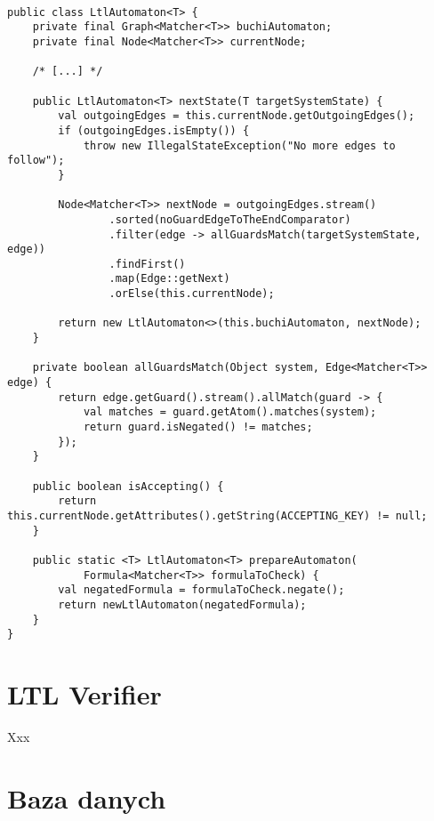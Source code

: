 \begin{minipage}{\linewidth}
\begin{lstlisting}[caption={Implementacja automatu Büchiego.},captionpos=b,label={lst:ltl_automaton}]

public class LtlAutomaton<T> {
    private final Graph<Matcher<T>> buchiAutomaton;
    private final Node<Matcher<T>> currentNode;

    /* [...] */

    public LtlAutomaton<T> nextState(T targetSystemState) {
        val outgoingEdges = this.currentNode.getOutgoingEdges();
        if (outgoingEdges.isEmpty()) {
            throw new IllegalStateException("No more edges to follow");
        }

        Node<Matcher<T>> nextNode = outgoingEdges.stream()
                .sorted(noGuardEdgeToTheEndComparator)
                .filter(edge -> allGuardsMatch(targetSystemState, edge))
                .findFirst()
                .map(Edge::getNext)
                .orElse(this.currentNode);

        return new LtlAutomaton<>(this.buchiAutomaton, nextNode);
    }

    private boolean allGuardsMatch(Object system, Edge<Matcher<T>> edge) {
        return edge.getGuard().stream().allMatch(guard -> {
            val matches = guard.getAtom().matches(system);
            return guard.isNegated() != matches;
        });
    }

    public boolean isAccepting() {
        return this.currentNode.getAttributes().getString(ACCEPTING_KEY) != null;
    }

    public static <T> LtlAutomaton<T> prepareAutomaton(
            Formula<Matcher<T>> formulaToCheck) {
        val negatedFormula = formulaToCheck.negate();
        return newLtlAutomaton(negatedFormula);
    }
}

\end{lstlisting}
\end{minipage}

\newpage

\section{LTL Verifier}

Xxx


\section{Baza danych}





